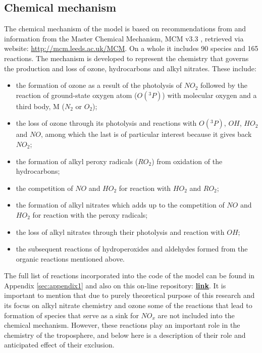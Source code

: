 \documentclass[11pt,a4paper]{article}
\begin{document}
\subsection{Chemical mechanism} \label{sec:method_chem}
The chemical mechanism of the model is based on recommendations from \citep{Atkinson2004} and information from the Master Chemical Mechanism, MCM v3.3 \citep{Jenkin1997,Saunders2003}, retrieved via website: \href{http://mcm.leeds.ac.uk/MCM}{http://mcm.leeds.ac.uk/MCM}. On a whole it includes 90 species and 165 reactions. The mechanism is developed to represent the chemistry that governs the production and loss of ozone, hydrocarbons and alkyl nitrates. These include:
\begin{itemize}
\item the formation of ozone as a result of the photolysis of $NO_2$ followed by the reaction of ground-state oxygen atom ($O(^3P)$) with molecular oxygen and a third body, M ($N_2$ or $O_2$);
\item the loss of ozone through its photolysis and reactions with $O(^3P)$, $OH$, $HO_2$ and $NO$, among which the last is of particular interest because it gives back $NO_2$;
\item the formation of alkyl peroxy radicals ($RO_2$) from oxidation of the hydrocarbons;
\item the competition of $NO$ and $HO_2$ for reaction with $HO_2$ and $RO_2$;
\item the formation of alkyl nitrates which adds up to the competition of $NO$ and $HO_2$ for reaction with the peroxy radicals;
\item the loss of alkyl nitrates through their photolysis and reaction with $OH$;
\item the subsequent reactions of hydroperoxides and aldehydes formed from the organic reactions mentioned above.
\end{itemize}
The full list of reactions incorporated into the code of the model can be found in Appendix \ref{sec:appendix1} and also on this on-line repository: \href{https://github.com/justmeteomary4/ENV-MB4X_model}{\textbf{link}}. It is important to mention that due to purely theoretical purpose of this research and its focus on alkyl nitrate chemistry and ozone some of the reactions that lead to formation of species that serve as a sink for $NO_x$ are not included into the chemical mechanism. However, these reactions play an important role in the chemistry of the troposphere, and below here is a description of their role and anticipated effect of their exclusion.
\end{document}
